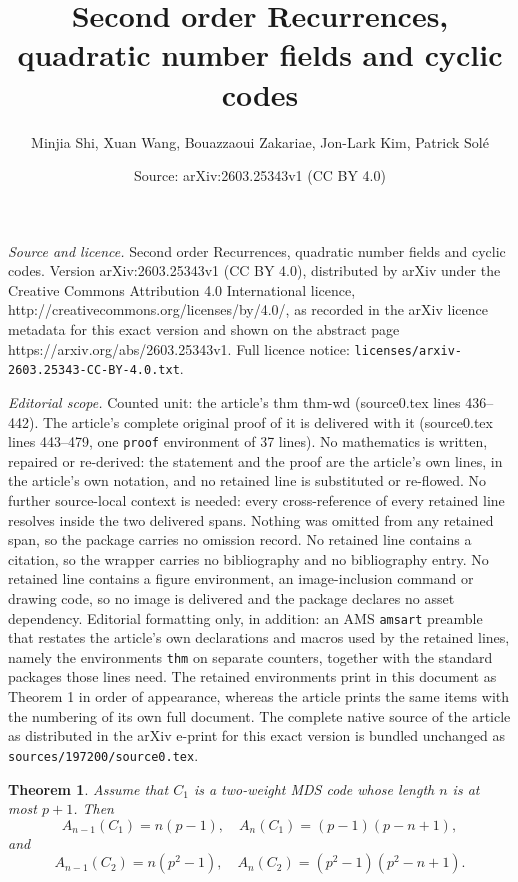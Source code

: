 \documentclass[10pt,a4paper]{amsart}
\title{Second order Recurrences, quadratic number fields and cyclic codes}
\author{Minjia Shi, Xuan Wang, Bouazzaoui Zakariae, Jon-Lark Kim, Patrick Sol\'e}
\date{Source: arXiv:2603.25343v1 (CC BY 4.0)}
\newtheorem{thm}{Theorem}
\begin{document}
\maketitle

\noindent\emph{Source and licence.} Second order Recurrences, quadratic number fields and cyclic codes. Version arXiv:2603.25343v1 (CC BY 4.0), distributed by arXiv under the Creative Commons Attribution 4.0 International licence, http://creativecommons.org/licenses/by/4.0/, as recorded in the arXiv licence metadata for this exact version and shown on the abstract page https://arxiv.org/abs/2603.25343v1. Full licence notice: \texttt{licenses/arxiv-2603.25343-CC-BY-4.0.txt}.\par\smallskip

\noindent\textit{Editorial scope.} Counted unit: the article's thm thm-wd (source0.tex lines 436--442). The article's complete original proof of it is delivered with it (source0.tex lines 443--479, one \texttt{proof} environment of 37 lines). No mathematics is written, repaired or re-derived: the statement and the proof are the article's own lines, in the article's own notation, and no retained line is substituted or re-flowed.  No further source-local context is needed: every cross-reference of every retained line resolves inside the two delivered spans.  Nothing was omitted from any retained span, so the package carries no omission record.  No retained line contains a citation, so the wrapper carries no bibliography and no bibliography entry.  No retained line contains a figure environment, an image-inclusion command or drawing code, so no image is delivered and the package declares no asset dependency.  Editorial formatting only, in addition: an AMS \texttt{amsart} preamble that restates the article's own declarations and macros used by the retained lines, namely the environments \texttt{thm} on separate counters, together with the standard packages those lines need.  The retained environments print in this document as Theorem 1 in order of appearance, whereas the article prints the same items with the numbering of its own full document.  The complete native source of the article as distributed in the arXiv e-print for this exact version is bundled unchanged as \texttt{sources/197200/source0.tex}.
\begin{thm} \label{thm-wd}
	Assume that $C_1$ is a two-weight MDS code whose length $n$ is at most $p+1$.
	Then
	\[ A_{n-1}(C_1) = n(p-1), \quad A_n(C_1) = (p-1)(p-n+1), \]
	and
	\[ A_{n-1}(C_2) = n(p^2-1), \quad A_n(C_2) = (p^2 - 1)(p^2 - n+1). \]
\end{thm}
\end{document}
